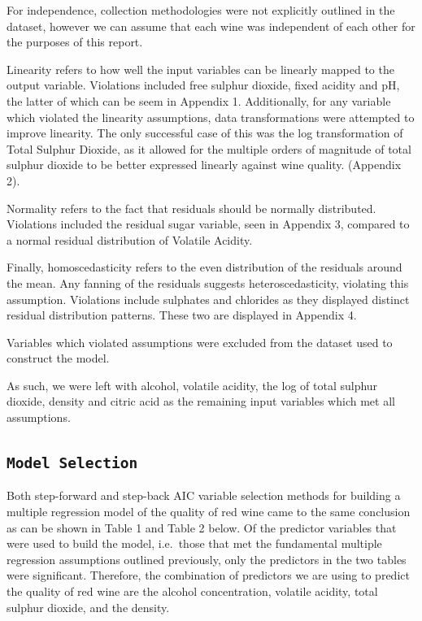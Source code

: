 \documentclass[letterpaper,8pt,twocolumn,twoside,]{pinp}
\begin{document}
For independence, collection methodologies were not explicitly outlined
in the dataset, however we can assume that each wine was independent of
each other for the purposes of this report.

Linearity refers to how well the input variables can be linearly mapped
to the output variable. Violations included free sulphur dioxide, fixed
acidity and pH, the latter of which can be seem in Appendix 1.
Additionally, for any variable which violated the linearity assumptions,
data transformations were attempted to improve linearity. The only
successful case of this was the log transformation of Total Sulphur
Dioxide, as it allowed for the multiple orders of magnitude of total
sulphur dioxide to be better expressed linearly against wine quality.
(Appendix 2).

Normality refers to the fact that residuals should be normally
distributed. Violations included the residual sugar variable, seen in
Appendix 3, compared to a normal residual distribution of Volatile
Acidity.

Finally, homoscedasticity refers to the even distribution of the
residuals around the mean. Any fanning of the residuals suggests
heteroscedasticity, violating this assumption. Violations include
sulphates and chlorides as they displayed distinct residual distribution
patterns. These two are displayed in Appendix 4.

Variables which violated assumptions were excluded from the dataset used
to construct the model.

As such, we were left with alcohol, volatile acidity, the log of total
sulphur dioxide, density and citric acid as the remaining input
variables which met all assumptions.

\hypertarget{model-selection}{%
\subsection{\texorpdfstring{\texttt{Model\ Selection}}{Model Selection}}\label{model-selection}}

Both step-forward and step-back AIC variable selection methods for
building a multiple regression model of the quality of red wine came to
the same conclusion as can be shown in Table 1 and Table 2 below. Of the
predictor variables that were used to build the model, i.e.~those that
met the fundamental multiple regression assumptions outlined previously,
only the predictors in the two tables were significant. Therefore, the
combination of predictors we are using to predict the quality of red
wine are the alcohol concentration, volatile acidity, total sulphur
dioxide, and the density.
\end{document}
